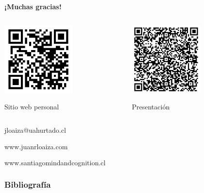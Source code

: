 \documentclass[%
            9pt,
                spanish, %
                    ignorenonframetext,
                    handout, %
                aspectratio=169, %
        ]{beamer}
\begin{document}
\section{}
\begin{frame}

    \centering
    {\LARGE
    \textbf{¡Muchas gracias!}}
    \vspace{-1em}

    \begin{minipage}[t]{0.7\textwidth}
    \begin{columns}
      \begin{column}{0.5\textwidth}
        \centering
        {
      \includegraphics[height=10em]{qr_juanrloaizacom.pdf}

      Sitio web personal
}
      \end{column}

      \begin{column}{0.5\textwidth}
        \centering
        {
      \includegraphics[height=10em]{linkppt.pdf}

      Presentación
}
      \end{column}
    \end{columns}
  \end{minipage}


    jloaiza@uahurtado.cl

    www.juanrloaiza.com

    www.santiagomindandcognition.cl

\end{frame}

\begin{frame}[allowframebreaks]
\frametitle{Bibliografía}
\printbibliography
\end{frame}
\end{document}
